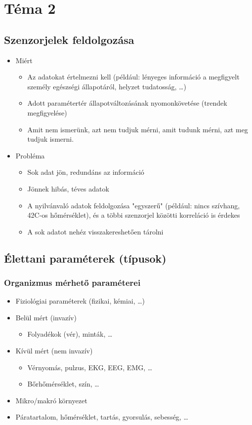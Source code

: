 ﻿\section{Téma 2}

\subsection{Szenzorjelek feldolgozása}
\begin{itemize}
    \item Miért
    \begin{itemize}
        \item Az adatokat értelmezni kell (például: lényeges információ a megfigyelt személy egészségi állapotáról, helyzet tudatosság, \dots)
        \item Adott paramétertér állapotváltozásának nyomonkövetése (trendek megfigyelése)
        \item Amit nem ismerünk, azt nem tudjuk mérni, amit tudunk mérni, azt meg tudjuk ismerni.
    \end{itemize}
    \item Probléma
    \begin{itemize}
        \item Sok adat jön, redundáns az információ
        \item Jönnek hibás, téves adatok
        \item A nyilvánvaló adatok feldolgozása "egyszerű" (például: nincs szívhang, 42C-os hőmérséklet), és a többi szenzorjel közötti korreláció is érdekes
        \item A sok adatot nehéz visszakereshetően tárolni
    \end{itemize}
\end{itemize}

\clearpage
\subsection{Élettani paraméterek (típusok)}
\subsubsection{Organizmus mérhető paraméterei}
\begin{itemize}
    \item Fiziológiai paraméterek (fizikai, kémiai, \dots)
    \item Belül mért (invazív)
    \begin{itemize}
        \item Folyadékok (vér), minták, \dots
    \end{itemize}
    \item Kívül mért (nem invazív)
    \begin{itemize}
        \item Vérnyomás, pulzus, EKG, EEG, EMG, \dots
        \item Bőrhőmérséklet, szín, \dots
    \end{itemize}
    \item Mikro/makró környezet
    \item Páratartalom, hőmérséklet, tartás, gyorsulás, sebesség, \dots
\end{itemize}

